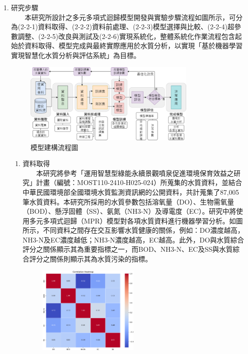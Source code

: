 \documentclass[12pt,a4paper]{article}
\begin{document}
\begin{enumerate}
\begin{enumerate}[label=\arabic*.]
\begin{enumerate}[label=2-1-\arabic*.]
    \end{enumerate}
\item 研究步驟\\
　　本研究所設計之多元多項式迴歸模型開發與實驗步驟流程如圖所示，可分為(2-2-1)資料取得、(2-2-2)資料前處理、(2-2-3)模型選擇與比較、(2-2-4)超參數調整、(2-2-5)改良與測試及(2-2-6)實現系統化，整體系統化作業流程包含起始於資料取得、模型完成與最終實際應用於水質分析，以實現「基於機器學習實現智慧化水質分析與評估系統」為目標。
    \begin{figure}[H]
        \centering
        \includegraphics[width=0.8\textwidth]{resources/image/模型建構流程圖.png}
        \caption{模型建構流程圖}
        \label{fig:research_steps}
    \end{figure}
    \begin{enumerate}[label=2-2-\arabic*.]
        \item 資料取得\\
        　　本研究將參考「運用智慧型綠能永續景觀噴泉促進環境保育效益之研究」計畫（編號：MOST110-2410-H025-024）所蒐集的水質資料，並結合中華民國環境部全國環境水質監測資訊網的公開資料，共計蒐集了87,005筆水質資料。本研究所採用的水質參數包括溶氧量（DO）、生物需氧量（BOD）、懸浮固體（SS）、氨氮（NH3-N）及導電度（EC）。研究中將使用多元多項式迴歸（MPR）模型對各項水質資料進行機器學習分析。如圖所示，不同資料之間存在交互影響水質健康的關係，例如：DO濃度越高，NH3-N及EC濃度越低；NH3-N濃度越高，EC越高。此外，DO與水質綜合評分之關係顯示其為重要指標之一，而BOD、NH3-N、EC及SS與水質綜合評分之關係則顯示其為水質污染的指標。        
            \begin{figure}[H]
                \centering
                \includegraphics[width=0.5\textwidth]{resources/image/heatmap.png}

\end{figure}
\end{enumerate}
\end{enumerate}
\end{enumerate}
\end{document}
